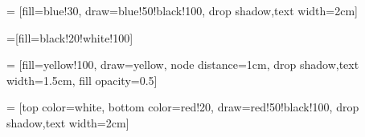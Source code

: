 \documentclass[../main.tex]{subfiles}
\begin{document}
\thispagestyle{empty}


 = [fill=blue!30, draw=blue!50!black!100, drop shadow,text width=2cm]

=[fill=black!20!white!100]

 = [fill=yellow!100, draw=yellow, node distance=1cm, drop shadow,text width=1.5cm, fill opacity=0.5]

 = [top color=white, bottom color=red!20, draw=red!50!black!100, drop shadow,text width=2cm]
\end{document}

